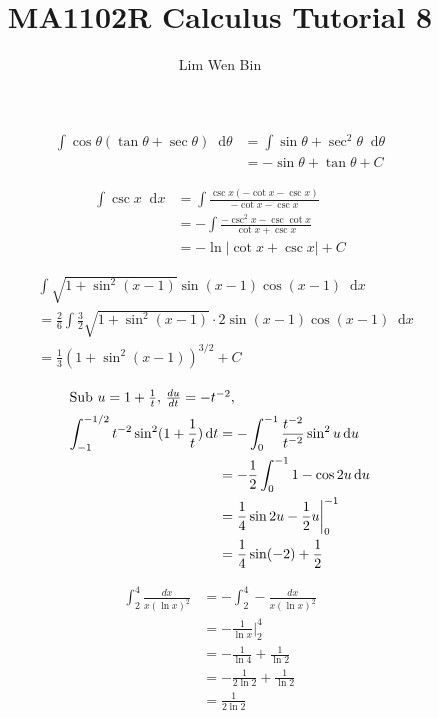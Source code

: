 \documentclass[12pt]{article}
\newcommand*\diff{\mathop{}\!\mathrm{d}}
\newenvironment{problem}[2][Problem]{\begin{trivlist}
\item[\hskip \labelsep {\bfseries #1}\hskip \labelsep {\bfseries #2.}]}{\end{trivlist}}
\begin{document}
\title{MA1102R Calculus Tutorial 8}
\author{Lim Wen Bin}
\maketitle
 
\begin{problem}{1.c}
\end{problem}
\begin{align*}
\int \cos\theta (\tan\theta + \sec\theta) \diff \theta &= \int \sin\theta + \sec^2\theta \diff \theta\\
&= -\sin\theta + \tan\theta + C
\end{align*}

\begin{problem}{1.f}
\end{problem}
\begin{align*}
\int \csc x \diff x &= \int \frac{\csc x (-\cot x - \csc x)}{-\cot x - \csc x}\\
&= -\int \frac{-\csc^2 x - \csc\cot x}{\cot x + \csc x}\\
&= -\ln |\cot x + \csc x| + C
\end{align*}

\begin{problem}{1.g}
\end{problem}
\begin{align*}
&\int \sqrt{1+\sin^2 (x-1)} \sin(x-1) \cos(x-1) \diff x\\
&= \frac{2}{6} \int \frac{3}{2} \sqrt{1+\sin^2 (x-1)} \cdot 2\sin(x-1) \cos(x-1) \diff x\\
&= \frac{1}{3} (1+ \sin^2 (x-1))^{3/2} + C
\end{align*}

\begin{problem}{2.c}
\end{problem}
\begin{align*}
\intertext{Sub $u = 1 + \frac{1}{t}$, $\frac{du}{dt} = -t^{-2}$,}
\int_{-1}^{-1/2} t^{-2} \sin^2 (1 + \frac{1}{t}) \diff t &= -\int_{0}^{-1} \frac{t^{-2}}{t^{-2}} \sin^2 u \diff u\\
&= -\frac{1}{2} \int_{0}^{-1} 1 - \cos 2u \diff u\\
&= \frac{1}{4} \sin 2u - \frac{1}{2} u \biggl|_{0}^{-1}\\
&= \frac{1}{4} \sin (-2) + \frac{1}{2}\\
\end{align*}

\begin{problem}{2.d}
\end{problem}
\begin{align*}
\int_{2}^{4} \frac{dx}{x(\ln x)^2} &= -\int_{2}^{4} -\frac{dx}{x(\ln x)^2}\\
&= -\frac{1}{\ln x} \biggl|_{2}^{4}\\
&= -\frac{1}{\ln 4} + \frac{1}{\ln 2}\\
&= -\frac{1}{2\ln 2} + \frac{1}{\ln 2}\\
&= \frac{1}{2\ln 2}\\
\end{align*}
\end{document}
